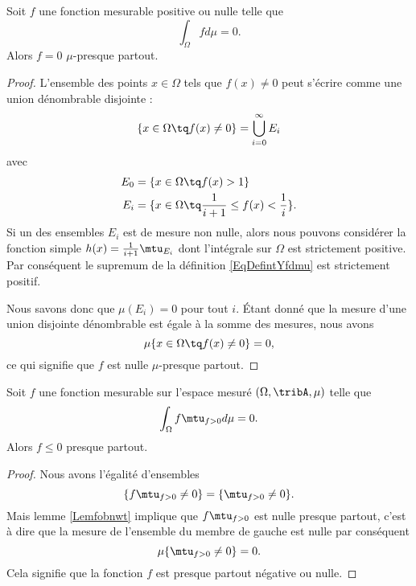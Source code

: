 \begin{lemma}   \label{Lemfobnwt}
    Soit \( f\) une fonction mesurable positive ou nulle telle que
    \begin{equation}
        \int_{\Omega}fd\mu=0.
    \end{equation}
    Alors \( f=0\) \( \mu\)-presque partout.
\end{lemma}

\begin{proof}
    L'ensemble des points \( x\in\Omega\) tels que \( f(x)\neq 0\) peut s'écrire comme une union dénombrable disjointe :
    \begin{equation}
        \{ x\in\Omega\tq f(x)\neq 0 \}=\bigcup_{i=0}^{\infty}E_i
    \end{equation}
    avec
    \begin{subequations}
        \begin{align}
            E_0&=\{ x\in\Omega\tq f(x)>1 \}\\
            E_i&=\{ x\in\Omega\tq \frac{1}{ i+1 }\leq f(x)<\frac{1}{ i } \}.
        \end{align}
    \end{subequations}
    Si un des ensembles \( E_i\) est de mesure non nulle, alors nous pouvons considérer la fonction simple \( h(x)=\frac{1}{ i+1 }\mtu_{E_i}\) dont l'intégrale sur \( \Omega\) est strictement positive. Par conséquent le supremum de la définition \eqref{EqDefintYfdmu} est strictement positif.

    Nous savons donc que \( \mu(E_i)=0\) pour tout \( i\). Étant donné que la mesure d'une union disjointe dénombrable est égale à la somme des mesures, nous avons
    \begin{equation}
        \mu\{ x\in\Omega\tq f(x)\neq 0 \}=0,
    \end{equation}
    ce qui signifie que \( f\) est nulle \( \mu\)-presque partout.
\end{proof}

\begin{corollary}   \label{CorjLYiSm}
    Soit \( f\) une fonction mesurable sur l'espace mesuré \( (\Omega,\tribA,\mu)\) telle que
    \begin{equation}
        \int_{\Omega}f\mtu_{f>0}d\mu=0.
    \end{equation}
    Alors \( f\leq 0\) presque partout.
\end{corollary}

\begin{proof}
    Nous avons l'égalité d'ensembles
    \begin{equation}
        \{ f\mtu_{f>0}\neq 0 \}=\{ \mtu_{f>0}\neq 0 \}.
    \end{equation}
    Mais lemme \ref{Lemfobnwt} implique que \( f\mtu_{f>0}\) est nulle presque partout, c'est à dire que la mesure de l'ensemble du membre de gauche est nulle par conséquent
    \begin{equation}
        \mu\{ \mtu_{f>0}\neq 0 \}=0.
    \end{equation}
    Cela signifie que la fonction \( f\) est presque partout négative ou nulle.
\end{proof}


